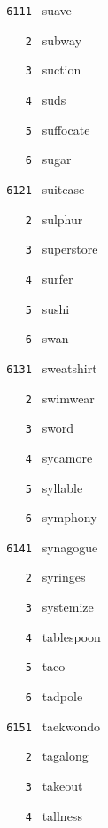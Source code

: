 \documentclass[11pt]{article}
\begin{document}
\begin{multicols}{6}
\footnotesize
\noindent \texttt{ 6111 } suave  \par
\noindent \texttt{ \ \ \ 2 } subway  \par
\noindent \texttt{ \ \ \ 3 } suction  \par
\noindent \texttt{ \ \ \ 4 } suds  \par
\noindent \texttt{ \ \ \ 5 } suffocate  \par
\noindent \texttt{ \ \ \ 6 } sugar  \par
\vspace{3mm}
\noindent \texttt{ 6121 } suitcase  \par
\noindent \texttt{ \ \ \ 2 } sulphur  \par
\noindent \texttt{ \ \ \ 3 } superstore  \par
\noindent \texttt{ \ \ \ 4 } surfer  \par
\noindent \texttt{ \ \ \ 5 } sushi  \par
\noindent \texttt{ \ \ \ 6 } swan  \par
\vspace{3mm}
\noindent \texttt{ 6131 } sweatshirt  \par
\noindent \texttt{ \ \ \ 2 } swimwear  \par
\noindent \texttt{ \ \ \ 3 } sword  \par
\noindent \texttt{ \ \ \ 4 } sycamore  \par
\noindent \texttt{ \ \ \ 5 } syllable  \par
\noindent \texttt{ \ \ \ 6 } symphony  \par
\vspace{3mm}
\noindent \texttt{ 6141 } synagogue  \par
\noindent \texttt{ \ \ \ 2 } syringes  \par
\noindent \texttt{ \ \ \ 3 } systemize  \par
\noindent \texttt{ \ \ \ 4 } tablespoon  \par
\noindent \texttt{ \ \ \ 5 } taco  \par
\noindent \texttt{ \ \ \ 6 } tadpole  \par
\vspace{3mm}
\noindent \texttt{ 6151 } taekwondo  \par
\noindent \texttt{ \ \ \ 2 } tagalong  \par
\noindent \texttt{ \ \ \ 3 } takeout  \par
\noindent \texttt{ \ \ \ 4 } tallness  \par

\end{multicols}
\end{document}
